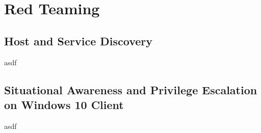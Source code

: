 

\section{Red Teaming}

\subsection{Host and Service Discovery}
asdf

\subsection{Situational Awareness and Privilege Escalation on Windows 10 Client}
asdf
